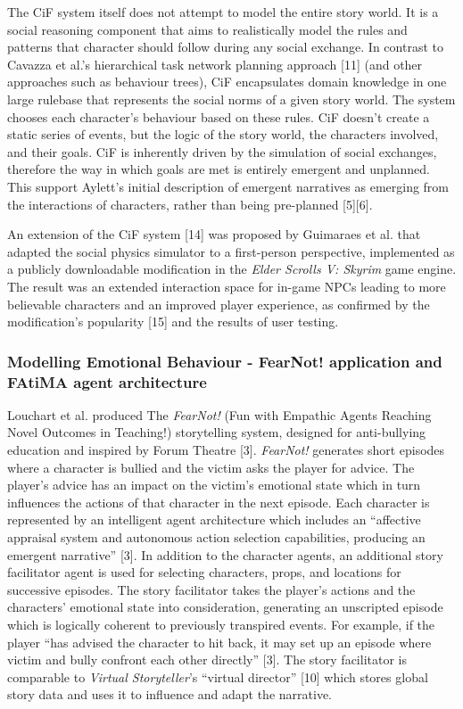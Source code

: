 \documentclass{sig-alternate-05-2015}
\begin{document}
\newline The CiF system itself does not attempt to model the entire story world. It is a social reasoning component that aims to realistically model the rules and patterns that character should follow during any social exchange. In contrast to Cavazza et al.'s hierarchical task network planning approach [11] (and other approaches such as behaviour trees), CiF encapsulates domain knowledge in one large rulebase that represents the social norms of a given story world. The system chooses each character's behaviour based on these rules. CiF doesn't create a static series of events, but the logic of the story world, the characters involved, and their goals. CiF is inherently driven by the simulation of social exchanges, therefore the way in which goals are met is entirely emergent and unplanned. This support Aylett's initial description of emergent narratives as emerging from the interactions of characters, rather than being pre-planned [5][6].

\newline An extension of the CiF system [14] was proposed by Guimaraes et al. that adapted the social physics simulator to a first-person perspective, implemented as a publicly downloadable modification in the \textit{Elder Scrolls V: Skyrim} game engine. The result was an extended interaction space for in-game NPCs leading to more believable characters and an improved player experience, as confirmed by the modification's popularity [15] and the results of user testing.

\subsubsection{Modelling Emotional Behaviour - FearNot! application and FAtiMA agent architecture}
Louchart et al. produced The \textit{FearNot!} (Fun with Empathic Agents Reaching Novel Outcomes in Teaching!) storytelling system, designed for anti-bullying education and inspired by Forum Theatre [3]. \textit{FearNot!} generates short episodes where a character is bullied and the victim asks the player for advice. The player's advice has an impact on the victim's emotional state which in turn influences the actions of that character in the next episode. Each character is represented by an intelligent agent architecture which includes an ``affective appraisal system and autonomous action selection capabilities, producing an emergent narrative'' [3]. In addition to the character agents, an additional story facilitator agent is used for selecting characters, props, and locations for successive episodes. The story facilitator takes the player's actions and the characters' emotional state into consideration, generating an unscripted episode which is logically coherent to previously transpired events. For example, if the player ``has advised the character to hit back, it may set up an episode where victim and bully confront each other directly'' [3]. The story facilitator is comparable to \textit{Virtual Storyteller}'s ``virtual director'' [10] which stores global story data and uses it to influence and adapt the narrative.
\end{document}
